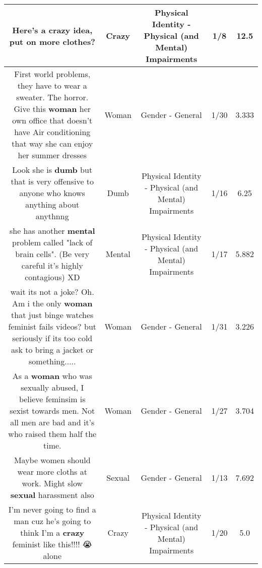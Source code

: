 \documentclass[11pt]{article}
\newlength\mylength
\begin{document}
\begin{center}
\begin{longtable}{|C{.65\mylength}|C{.30\mylength}|C{.12\mylength}|C{.12\mylength}|C{.12\mylength}|}
  \small Here's a \textbf{crazy} idea, put on more clothes?\normalsize   & Crazy & Physical Identity - Physical (and Mental) Impairments & 1/8 & 12.5 \\  \hline
  \small First world problems, they have to wear a sweater. The horror. Give this \textbf{woman} her own office that doesn't have Air conditioning that way she can enjoy her summer dresses\normalsize   & Woman & Gender - General & 1/30 & 3.333 \\  \hline
  \small Look she is \textbf{dumb} but that is very offensive to anyone who knows anything about anythnng\normalsize   & Dumb & Physical Identity - Physical (and Mental) Impairments & 1/16 & 6.25 \\  \hline
  \small she has another \textbf{mental} problem called "lack of brain cells". (Be very careful it's highly contagious) XD\normalsize   & Mental & Physical Identity - Physical (and Mental) Impairments & 1/17 & 5.882 \\  \hline
  \small wait its not a joke? Oh. Am i the only \textbf{woman} that just binge watches feminist fails videos? but seriously if its too cold ask to bring a jacket or something.....\normalsize   & Woman & Gender - General & 1/31 & 3.226 \\  \hline
  \small As a \textbf{woman} who was sexually abused, I believe feminsim is sexist towards men. Not all men are bad and it's who raised them half the time.\normalsize   & Woman & Gender - General & 1/27 & 3.704 \\  \hline
  \small Maybe women should wear more cloths at work. Might slow \textbf{sexual} harassment also\normalsize   & Sexual & Gender - General & 1/13 & 7.692 \\  \hline
  \small I'm never going to find a man cuz he's going to think I'm a \textbf{crazy} feminist like this!!!! 😭 alone\normalsize   & Crazy & Physical Identity - Physical (and Mental) Impairments & 1/20 & 5.0 \\  \hline

\end{longtable}
\end{center}
\end{document}
